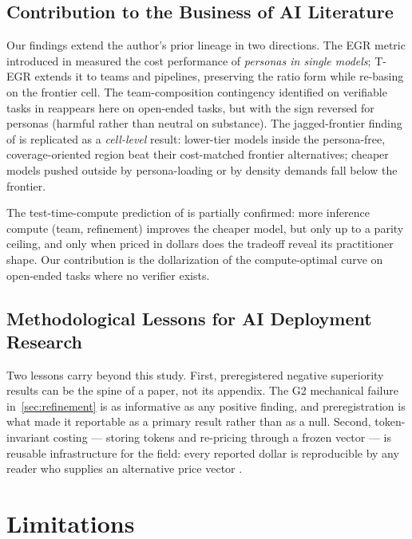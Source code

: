 \documentclass[12pt,a4paper]{article}
\begin{document}
\subsection{Contribution to the Business of AI Literature}

Our findings extend the author's prior lineage in two directions. The EGR metric
introduced in \citet{Hariri2026b} measured the cost performance of \emph{personas
in single models}; T-EGR extends it to teams and pipelines, preserving the ratio
form while re-basing on the frontier cell. The team-composition contingency
identified on verifiable tasks in \citet{Hariri2025b} reappears here on open-ended
tasks, but with the sign reversed for personas (harmful rather than neutral on
substance). The jagged-frontier finding of \citet{DellAcquaEtAl2023} is replicated
as a \emph{cell-level} result: lower-tier models inside the persona-free,
coverage-oriented region beat their cost-matched frontier alternatives; cheaper
models pushed outside by persona-loading or by density demands fall below the
frontier.

The test-time-compute prediction of \citet{SnellEtAl2024} is partially confirmed:
more inference compute (team, refinement) improves the cheaper model, but only up
to a parity ceiling, and only when priced in dollars does the tradeoff reveal its
practitioner shape. Our contribution is the dollarization of the compute-optimal
curve on open-ended tasks where no verifier exists.

\subsection{Methodological Lessons for AI Deployment Research}

Two lessons carry beyond this study. First, preregistered negative superiority
results can be the spine of a paper, not its appendix. The G2 mechanical failure
in~\cref{sec:refinement} is as informative as any positive finding, and
preregistration is what made it reportable as a primary result rather than as a
null. Second, token-invariant costing --- storing tokens and re-pricing through a
frozen vector --- is reusable infrastructure for the field: every reported dollar
is reproducible by any reader who supplies an alternative price vector
\citep{Diewert1976, SandveEtAl2013}.


\section{Limitations}\label{sec:limitations}
\end{document}
